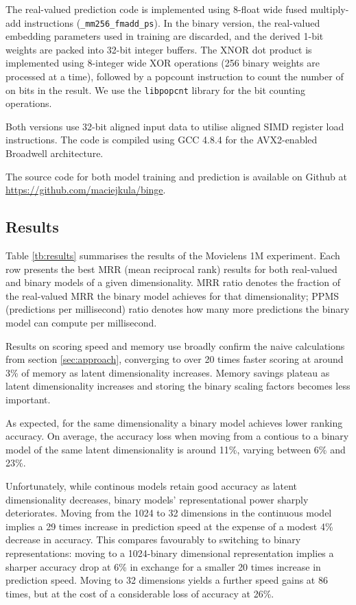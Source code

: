 \documentclass[sigchi]{acmart}
\begin{document}
The real-valued prediction code is implemented using 8-float wide fused multiply-add instructions (\texttt{\_mm256\_fmadd\_ps}). In the binary version, the real-valued embedding parameters used in training are discarded, and the derived 1-bit weights are packed into 32-bit integer buffers. The XNOR dot product is implemented using 8-integer wide XOR operations (256 binary weights are processed at a time), followed by a popcount instruction to count the number of on bits in the result. We use the \texttt{libpopcnt} \citep{mula2016faster} library for the bit counting operations.

Both versions use 32-bit aligned input data to utilise aligned SIMD register load instructions. The code is compiled using GCC 4.8.4 for the AVX2-enabled Broadwell architecture.

The source code for both model training and prediction is available on Github at \url{https://github.com/maciejkula/binge}.

\subsection{Results}
\label{sec:results}
Table \ref{tb:results} summarises the results of the Movielens 1M experiment. Each row presents the best MRR (mean reciprocal rank) results for both real-valued and binary models of a given dimensionality. MRR ratio denotes the fraction of the real-valued MRR the binary model achieves for that dimensionality; PPMS (predictions per millisecond) ratio denotes how many more predictions the binary model can compute per millisecond.

Results on scoring speed and memory use broadly confirm the naive calculations from section \ref{sec:approach}, converging to over 20 times faster scoring at around 3\% of memory as latent dimensionality increases. Memory savings plateau as latent dimensionality increases and storing the binary scaling factors becomes less important.

As expected, for the same dimensionality a binary model achieves lower ranking accuracy. On average, the accuracy loss when moving from a contious to a binary model of the same latent dimensionality is around 11\%, varying between 6\% and 23\%.

Unfortunately, while continous models retain good accuracy as latent dimensionality decreases, binary models' representational power sharply deteriorates. Moving from the 1024 to 32 dimensions in the continuous model implies a 29 times increase in prediction speed at the expense of a modest 4\% decrease in accuracy. This compares favourably to switching to binary representations: moving to a 1024-binary dimensional representation implies a sharper accuracy drop at 6\% in exchange for a smaller 20 times increase in prediction speed. Moving to 32 dimensions yields a further speed gains at 86 times, but at the cost of a considerable loss of accuracy at 26\%.
\end{document}
